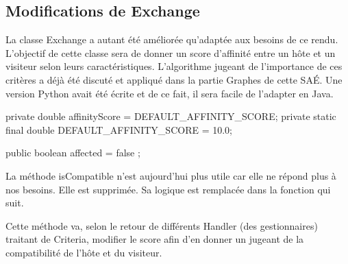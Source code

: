 \documentclass{mytex}
\begin{document}
\subsection{Modifications de Exchange}

La classe Exchange a autant été améliorée qu'adaptée aux besoins de ce rendu. L'objectif de cette classe sera de donner un score d'affinité entre un hôte et un visiteur selon leurs caractéristiques. L'algorithme jugeant de l'importance de ces critères a déjà été discuté et appliqué dans la partie Graphes de cette SAÉ. Une version Python avait été écrite et de ce fait, il sera facile de l'adapter en Java.


\begin{codebox}
private double affinityScore = DEFAULT_AFFINITY_SCORE;
private static final double DEFAULT_AFFINITY_SCORE = 10.0;

public boolean affected = false ;
\end{codebox}


La méthode isCompatible n'est aujourd'hui plus utile car elle ne répond plus à nos besoins. Elle est supprimée. Sa logique est remplacée dans la fonction qui suit.


Cette méthode va, selon le retour de différents Handler (des gestionnaires) traitant de Criteria, modifier le score afin d'en donner un jugeant de la compatibilité de l'hôte et du visiteur.
\end{document}
